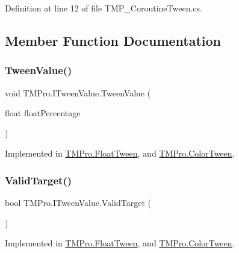 Definition at line 12 of file T\+M\+P\+\_\+\+Coroutine\+Tween.\+cs.



\subsection{Member Function Documentation}
\mbox{\label{interface_t_m_pro_1_1_i_tween_value_aed9322f3d92691a29267b72c104b40bf}} 
\subsubsection{\texorpdfstring{TweenValue()}{TweenValue()}}
{\footnotesize\ttfamily void T\+M\+Pro.\+I\+Tween\+Value.\+Tween\+Value (\begin{DoxyParamCaption}\item[{float}]{float\+Percentage }\end{DoxyParamCaption})}



Implemented in \mbox{\hyperlink{struct_t_m_pro_1_1_float_tween_ae58254bf8799dddc55990ec1f0082c6d}{T\+M\+Pro.\+Float\+Tween}}, and \mbox{\hyperlink{struct_t_m_pro_1_1_color_tween_aa2ab2acdd602a7f7c73c179d4b0b92f5}{T\+M\+Pro.\+Color\+Tween}}.

\mbox{\label{interface_t_m_pro_1_1_i_tween_value_ae0e763108b1d0fe8f9e34661a16fa994}} 
\subsubsection{\texorpdfstring{ValidTarget()}{ValidTarget()}}
{\footnotesize\ttfamily bool T\+M\+Pro.\+I\+Tween\+Value.\+Valid\+Target (\begin{DoxyParamCaption}{ }\end{DoxyParamCaption})}



Implemented in \mbox{\hyperlink{struct_t_m_pro_1_1_float_tween_a3d09fd870431b55a0632db8da6356ee1}{T\+M\+Pro.\+Float\+Tween}}, and \mbox{\hyperlink{struct_t_m_pro_1_1_color_tween_adab4fef0982d1c37120c45baa1bf1111}{T\+M\+Pro.\+Color\+Tween}}.



